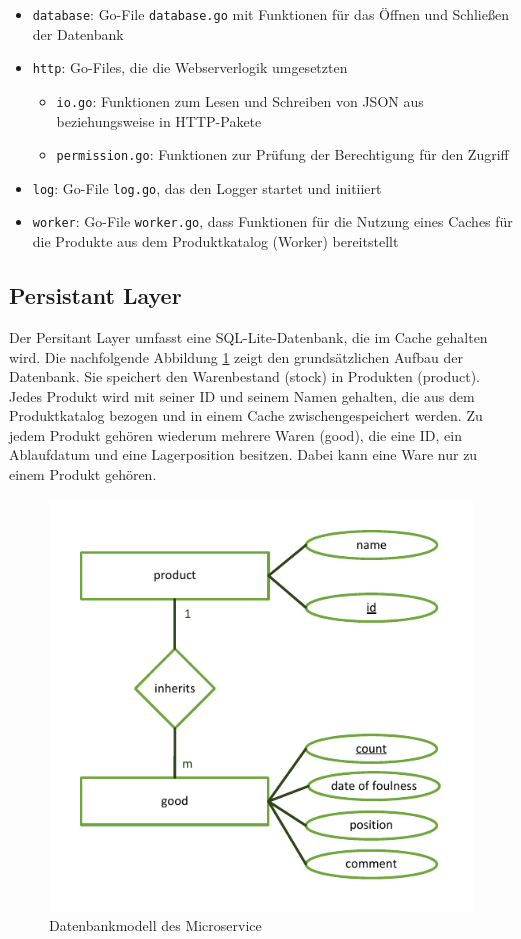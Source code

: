 	\begin{itemize}
	\item \texttt{database}: Go-File \texttt{database.go} mit Funktionen für das Öffnen und Schließen der Datenbank
	\item \texttt{http}: Go-Files, die die Webserverlogik umgesetzten
		\begin{itemize}
		\item \texttt{io.go}: Funktionen zum Lesen und Schreiben von JSON aus beziehungsweise in HTTP-Pakete
		\item \texttt{permission.go}: Funktionen zur Prüfung der Berechtigung für den Zugriff
		\end{itemize}	
	\item \texttt{log}: Go-File \texttt{log.go}, das den Logger startet und initiiert
	\item \texttt{worker}: Go-File \texttt{worker.go}, dass Funktionen für die Nutzung eines Caches für die Produkte aus dem Produktkatalog (Worker) bereitstellt 
	\end{itemize}


\subsection{Persistant Layer}
Der Persitant Layer umfasst eine SQL-Lite-Datenbank, die im Cache gehalten wird. Die nachfolgende Abbildung \ref{pic:Datenbankmodell des Microservice} zeigt den grundsätzlichen Aufbau der Datenbank. Sie speichert den Warenbestand (stock) in Produkten (product). Jedes Produkt wird mit seiner ID und seinem Namen gehalten, die aus dem Produktkatalog bezogen und in einem Cache zwischengespeichert werden. Zu jedem Produkt gehören wiederum mehrere Waren (good), die eine ID, ein Ablaufdatum und eine Lagerposition besitzen. Dabei kann eine Ware nur zu einem Produkt gehören.

\begin{figure}[H]
	\centering
	\includegraphics[width=0.65 \textwidth]{./pics/db.pdf}
	\caption{Datenbankmodell des Microservice}
	\label{pic:Datenbankmodell des Microservice}
\end{figure}


